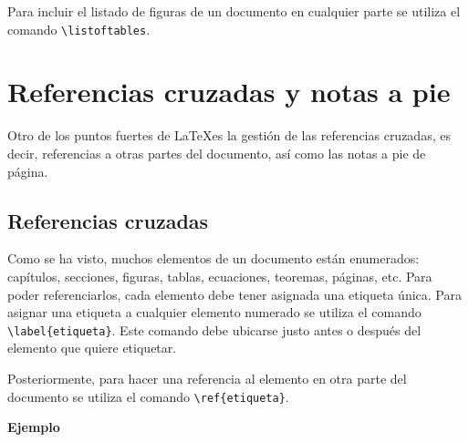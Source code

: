 \documentclass[
  letterpaper,
  DIV=11,
  numbers=noendperiod]{scrreport}
\begin{document}
Para incluir el listado de figuras de un documento en cualquier parte se
utiliza el comando \texttt{\textbackslash{}listoftables}.


\hypertarget{referencias-cruzadas-y-notas-a-pie}{%
\chapter{Referencias cruzadas y notas a
pie}\label{referencias-cruzadas-y-notas-a-pie}}

Otro de los puntos fuertes de \LaTeX es la gestión de las
referencias cruzadas, es decir, referencias a otras partes del
documento, así como las notas a pie de página.

\hypertarget{referencias-cruzadas}{%
\section{Referencias cruzadas}\label{referencias-cruzadas}}

Como se ha visto, muchos elementos de un documento están enumerados:
capítulos, secciones, figuras, tablas, ecuaciones, teoremas, páginas,
etc. Para poder referenciarlos, cada elemento debe tener asignada una
etiqueta única. Para asignar una etiqueta a cualquier elemento numerado
se utiliza el comando \texttt{\textbackslash{}label\{etiqueta\}}. Este
comando debe ubicarse justo antes o después del elemento que quiere
etiquetar.

Posteriormente, para hacer una referencia al elemento en otra parte del
documento se utiliza el comando
\texttt{\textbackslash{}ref\{etiqueta\}}.

\textbf{Ejemplo}
\end{document}
